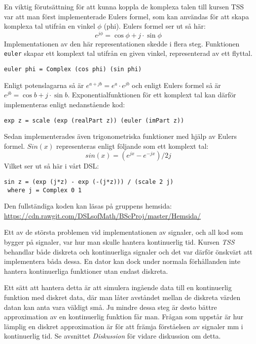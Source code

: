 \documentclass[12pt,a4paper,twoside,openright]{article}
\begin{document}
En viktig förutsättning för att kunna koppla de komplexa talen till
kursen TSS var att man först implementerade Eulers formel, som kan
användas för att skapa komplexa tal utifrån en vinkel \(\phi\)
(phi). Eulers formel ser ut så här:
\[e^{j\phi}=\cos \phi+ j \cdot \sin \phi \]
Implementationen av den här representationen skedde i flera steg.
Funktionen \texttt{euler} skapar ett komplext tal utifrån
en given vinkel, representerad av ett flyttal.
\begin{verbatim}
euler phi = Complex (cos phi) (sin phi)
\end{verbatim}
Enligt potenslagarna %
så är \(e^{a+jb} = e^{a} \cdot e^{jb}\) och enligt Eulers formel så är
\(e^{j b} = \cos b + j\cdot \sin b\).
%
Exponentialfunktionen för ett komplext tal kan därför implementeras
enligt nedanstående kod:

\begin{verbatim}
exp z = scale (exp (realPart z)) (euler (imPart z))
\end{verbatim}
Sedan implementerades även trigonometriska funktioner med hjälp av
Eulers formel. $Sin(x)$ representeras enligt följande som ett komplext tal:
\[ sin(x) = (e^{j x} - e^{-j x}) / 2 j \]
Vilket ser ut så här i vårt DSL:
\begin{verbatim}
sin z = (exp (j*z) - exp (-(j*z))) / (scale 2 j)
 where j = Complex 0 1
\end{verbatim}

Den fullständiga koden kan läsas på gruppens hemsida:
\url{https://cdn.rawgit.com/DSLsofMath/BScProj/master/Hemsida/}

Ett av de största problemen vid implementationen av signaler, och all
kod som bygger på signaler, var hur man skulle hantera kontinuerlig
tid. Kursen \textit{TSS} behandlar både diskreta och kontinuerliga
signaler och det var därför önskvärt att implementera båda dessa. En
dator kan dock under normala förhållanden inte hantera kontinuerliga
funktioner utan endast diskreta. %

Ett sätt att hantera detta är att simulera ingående data till en
kontinuerlig funktion med diskret data, där man låter avståndet mellan
de diskreta värden datan kan anta vara väldigt små. Ju mindre dessa
steg är desto bättre approximation av en kontinuerlig funktion får
man. Frågan som uppstår är hur lämplig en diskret approximation är för
att främja förståelsen av signaler mm i kontinuerlig tid. Se avsnittet
\textit{Diskussion} för vidare diskussion om detta.
\end{document}
